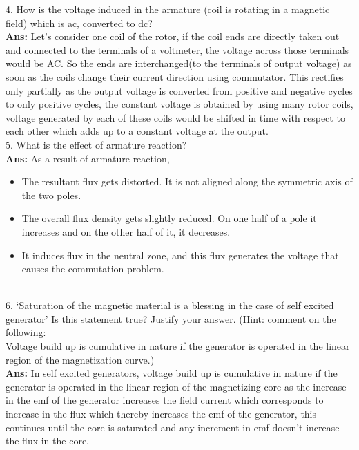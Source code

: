 \documentclass[12pt]{article}
\begin{document}
    4. How is the voltage induced in the armature (coil is rotating in a magnetic field) which is ac, converted to dc?\vspace{0.1cm}\\
    \textbf{Ans:} Let's consider one coil of the rotor, if the coil ends are directly taken out and connected to the terminals of a voltmeter, the voltage across those terminals would be AC. So the ends are interchanged(to the terminals of output voltage) as soon as the coils change their current direction using commutator. This rectifies only partially as the output voltage is converted from positive and negative cycles to only positive cycles, the constant voltage is obtained by using many rotor coils, voltage generated by each of these coils would be shifted in time with respect to each other which adds up to a constant voltage at the output.
    \vspace{0.1cm}\\
    5. What is the effect of armature reaction?\vspace{0.1cm}\\
    \textbf{Ans:} As a result of armature reaction,
    \begin{itemize}
        \item The resultant flux gets distorted. It is not aligned along the symmetric axis of the two poles.
        \item The overall flux density gets slightly reduced. On one half of a pole it increases and on the other half of it, it decreases.
        \item It induces flux in the neutral zone, and this flux generates the voltage that causes the commutation problem.
    \end{itemize}
    \vspace{0.1cm}\\
    6. `Saturation of the magnetic material is a blessing in the case of self excited generator' Is this statement true? Justify your answer. (Hint: comment on the following:\\
     Voltage build up is cumulative in nature if the generator is operated in the linear region of the magnetization curve.)\vspace{0.1cm}\\
    \textbf{Ans:} In self excited generators, voltage build up is cumulative in nature if the generator is operated in the linear region of the magnetizing core as the increase in the emf of the generator increases the field current which corresponds to increase in the flux which thereby increases the emf of the generator, this continues until the core is saturated and any increment in emf doesn't increase the flux in the core.
    
\end{document}
